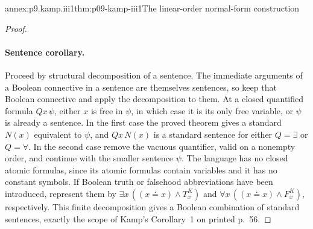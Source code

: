 \begin{annexitem}{annex:p9.kamp.iii1}{thm:p09-kamp-iii1}{The linear-order normal-form construction}
\begin{proof}
\paragraph{Sentence corollary.}
Proceed by structural decomposition of a sentence.  The immediate arguments
of a Boolean connective in a sentence are themselves sentences, so keep
that Boolean connective and apply the decomposition to them.  At a closed
quantified formula \(Qx\,\psi\), either \(x\) is free in \(\psi\),
in which case it is its only free variable, or \(\psi\) is already a
sentence.  In the first case the proved theorem gives a standard
\(N(x)\) equivalent to \(\psi\), and \(Qx\,N(x)\) is a standard
sentence for either \(Q=\exists\) or \(Q=\forall\).  In the second
case remove the vacuous quantifier, valid on a nonempty order, and continue
with the smaller sentence \(\psi\).  The language has no closed atomic
formulas, since its atomic formulas contain variables and it has no constant
symbols.  If Boolean truth or falsehood abbreviations have been introduced,
represent them by \(\exists x\,((x\doteq x)\land T^K_x)\) and
\(\forall x\,((x\doteq x)\land F^K_x)\), respectively.
This finite decomposition gives a Boolean combination of standard sentences,
exactly the scope of Kamp's Corollary~1 on printed p.~56.
\end{proof}
\end{annexitem}
